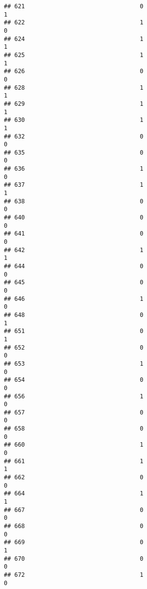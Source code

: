\documentclass[
]{article}
\begin{document}
\begin{verbatim}
## 621                                 0                                1
## 622                                 1                                0
## 624                                 1                                1
## 625                                 1                                1
## 626                                 0                                0
## 628                                 1                                1
## 629                                 1                                1
## 630                                 1                                1
## 632                                 0                                0
## 635                                 0                                0
## 636                                 1                                0
## 637                                 1                                1
## 638                                 0                                0
## 640                                 0                                0
## 641                                 0                                0
## 642                                 1                                1
## 644                                 0                                0
## 645                                 0                                0
## 646                                 1                                0
## 648                                 0                                1
## 651                                 0                                1
## 652                                 0                                0
## 653                                 1                                0
## 654                                 0                                0
## 656                                 1                                0
## 657                                 0                                0
## 658                                 0                                0
## 660                                 1                                0
## 661                                 1                                1
## 662                                 0                                0
## 664                                 1                                1
## 667                                 0                                0
## 668                                 0                                0
## 669                                 0                                1
## 670                                 0                                0
## 672                                 1                                0

\end{verbatim}
\end{document}
